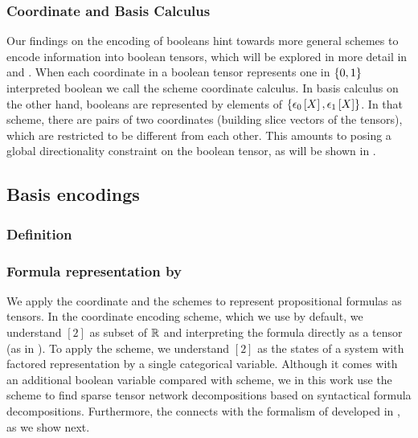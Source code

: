 \subsubsection{Coordinate and Basis Calculus}

Our findings on the encoding of booleans hint towards more general schemes to encode information into boolean tensors, which will be explored in more detail in  and .
When each coordinate in a boolean tensor represents one in $\{0,1\}$ interpreted boolean we call the scheme coordinate calculus.
In basis calculus on the other hand, booleans are represented by elements of $\{\epsilon_{0}\left[X\right],\epsilon_{1}\left[X\right]\}$.
In that scheme, there are pairs of two coordinates (building slice vectors of the tensors), which are restricted to be different from each other.
This amounts to posing a global directionality constraint on the boolean tensor, as will be shown in .

\subsection{Basis encodings}


\subsubsection{Definition}

\begin{definition}

\end{definition}

\subsubsection{Formula representation by \ComputationActivationNetworks{}}

We apply the coordinate and the \basisEncoding{} schemes to represent propositional formulas as tensors.
In the coordinate encoding scheme, which we use by default, we understand $[2]$ as subset of $\mathbb{R}$ and interpreting the formula directly as a tensor (as in ).
To apply the \basisEncoding{} scheme, we understand $[2]$ as the states of a system with factored representation by a single categorical variable.
Although it comes with an additional boolean variable compared with \coordinateEncoding{} scheme, we in this work use the \basisEncoding{} scheme to find sparse tensor network decompositions based on syntactical formula decompositions.
Furthermore, the \basisEncoding{} connects with the formalism of \ComputationActivationNetworks{} developed in , as we show next.

